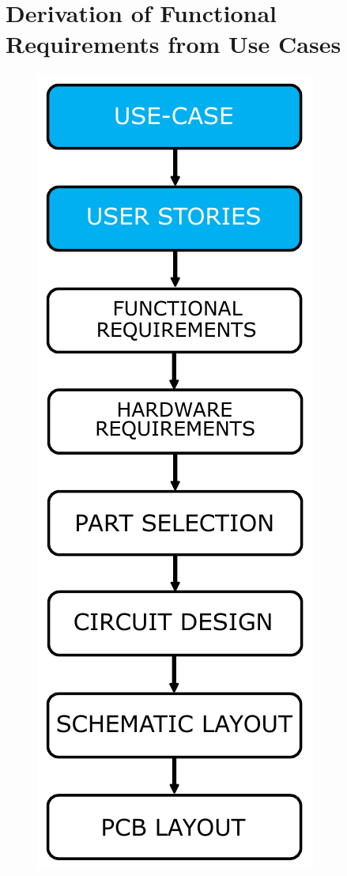 \chapter{Derivation of Functional Requirements from Use Cases} %

\label{Chapter3} %

\begin{figure}[!htb]
	\includegraphics[width=0.5\linewidth]{Figures/usecases.pdf}\centering
	\label{fig:usecases}
\end{figure}

%
%


